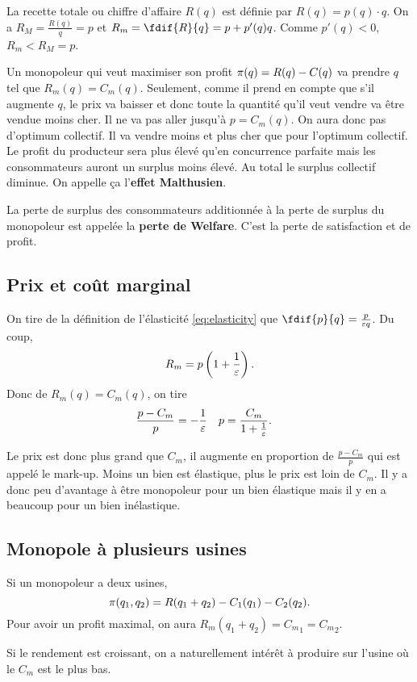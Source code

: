La recette totale ou chiffre d'affaire $R(q)$ est définie par
$R(q) = p(q) \cdot q$.
On a $R_M = \frac{R(q)}{q} = p$ et $R_m = \fdif{R}{q} = p + p'(q)q$.
Comme $p'(q) < 0$, $R_m < R_M = p$.

Un monopoleur qui veut maximiser son profit $\pi(q) = R(q) - C(q)$
va prendre $q$ tel que $R_m(q) = C_m(q)$.
Seulement, comme il prend en compte que s'il augmente $q$,
le prix va baisser et donc toute la quantité qu'il veut vendre va être vendue
moins cher.
Il ne va pas aller jusqu'à $p = C_m(q)$. On aura donc pas d'optimum collectif.
Il va vendre moins et plus cher que pour l'optimum collectif.
Le profit du producteur sera plus élevé qu'en concurrence parfaite mais
les consommateurs auront un surplus moins élevé.
Au total le surplus collectif diminue.
On appelle ça l'\textbf{effet Malthusien}.

La perte de surplus des consommateurs additionnée à la perte de surplus
du monopoleur est appelée la \textbf{perte de Welfare}.
C'est la perte de satisfaction et de profit.



\subsection{Prix et coût marginal}
On tire de la définition de l'élasticité \eqref{eq:elasticity} que
$\fdif{p}{q} = \frac{p}{\elasticity q}$. Du coup,
\[ R_m = p\left(1+\frac{1}{\varepsilon}\right). \]
Donc de $R_m(q) = C_m(q)$, on tire
\begin{align*}
  \frac{p-C_m}{p} & = -\frac{1}{\varepsilon} &
  p & = \frac{C_m}{1+\frac{1}{\varepsilon}}.
\end{align*}

Le prix est donc plus grand que $C_m$, il augmente en proportion de
$\frac{p-C_m}{p}$ qui est appelé le mark-up.
Moins un bien est élastique, plus le prix est loin de $C_m$.
Il y a donc peu d'avantage à être monopoleur pour un bien élastique
mais il y en a beaucoup pour un bien inélastique.

\subsection{Monopole à plusieurs usines}
Si un monopoleur a deux usines,
\[ \pi(q_1,q_2) = R(q_1 + q_2) - C_1(q_1) - C_2(q_2). \]
Pour avoir un profit maximal, on aura
$R_m(q_1+q_2) = {C_m}_1 = {C_m}_2$.

Si le rendement est croissant, on a naturellement intérêt à produire
sur l'usine où le $C_m$ est le plus bas.

